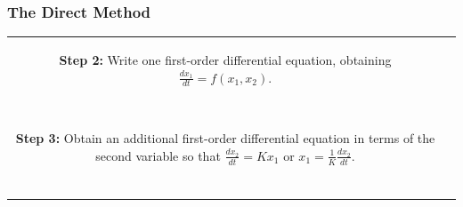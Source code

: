 \documentclass[aspectratio=169]{beamer}
\begin{document}

\begin{frame}[fragile]
	\frametitle{The Direct Method}
		\begin{tabular}{cc}

		\begin{columns}
		\begin{column}{1\textwidth}  %
\small		\textbf{Step 2:} Write one first-order differential equation, obtaining $\frac{dx_1}{dt}=f(x_1,x_2)$.
		\end{column}
		\end{columns}\\
	\begin{columns}
	\begin{column}{.5\textwidth}  %
\center		$-i_s+\frac{v}{R}+i+C\frac{dv}{dt}=0$\\
				\end{column}
	\begin{column}{.5\textwidth}  %
\center		$-v_s+L\frac{di}{dt}+v+Ri=0$\\
				\end{column}				
	\end{columns}\\
		\begin{columns}
		\begin{column}{1\textwidth}  %
\small	\newline	\textbf{Step 3:} Obtain an additional first-order differential equation in terms of the second variable so that 
$\frac{dx_2}{dt}=Kx_1$ or $x_1=\frac{1}{K}\frac{dx_2}{dt}$.
		\end{column}
		\end{columns}\\
	\begin{columns}
	\begin{column}{.5\textwidth}  %
\center				$v=L \frac{di}{dt}$\\
				\end{column}
	\begin{column}{.5\textwidth}  %
\center				$i=C \frac{dv}{dt}$\\
				\end{column}				
	\end{columns}\\	
		\begin{columns}
		\begin{column}{1\textwidth}  %

\end{column}
\end{columns}
\end{tabular}
\end{frame}
\end{document}
